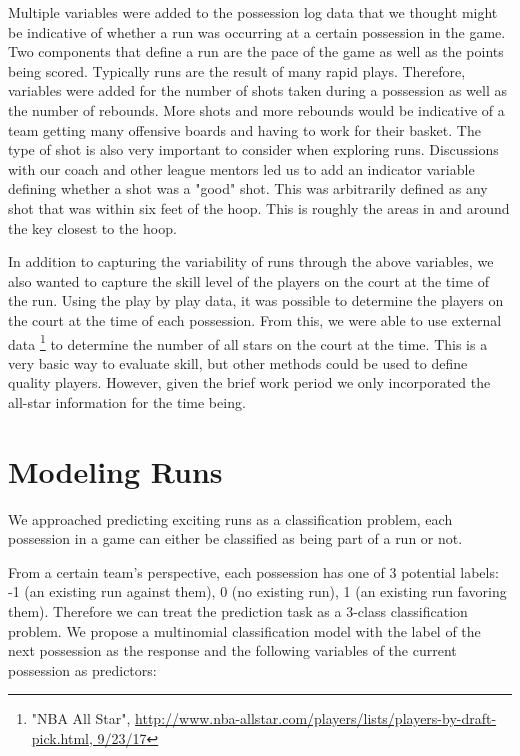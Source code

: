 \documentclass{article}
\begin{document}
Multiple variables were added to the possession log data that we thought might be indicative of whether a run was occurring at a certain possession in the game.  Two components that define a run are the pace of the game as well as the points being scored. Typically runs are the result of many rapid plays. Therefore, variables were added for the number of shots taken during a possession as well as the number of rebounds. More shots and more rebounds would be indicative of a team getting many offensive boards and having to work for their basket. The type of shot is also very important to consider when exploring runs. Discussions with our coach and other league mentors led us to add an indicator variable defining whether a shot was a "good" shot. This was arbitrarily defined as any shot that was within six feet of the hoop. This is roughly the areas in and around the key closest to the hoop. \newline

In addition to capturing the variability of runs through the above variables, we also wanted to capture the skill level of the players on the court at the time of the run. Using the play by play data, it was possible to determine the players on the court at the time of each possession. From this, we were able to use external data \footnote{"NBA All Star", \url{http://www.nba-allstar.com/players/lists/players-by-draft-pick.html, 9/23/17}} to determine the number of all stars on the court at the time. This is a very basic way to evaluate skill, but other methods could be used to define quality players. However, given the brief work period we only incorporated the all-star information for the time being. 

\section{Modeling Runs}

We approached predicting exciting runs as a classification problem, each possession in a game can either be classified as being part of a run or not. \newline

From a certain team's perspective, each possession has one of 3 potential labels: -1 (an existing run against them), 0 (no existing run), 1 (an existing run favoring them). Therefore we can treat the prediction task as a 3-class classification problem. We propose a multinomial classification model with the label of the next possession as the response and the following variables of the current possession as predictors:\newline
\end{document}

